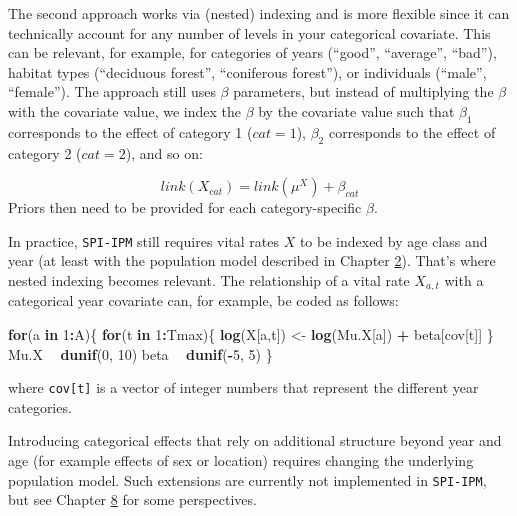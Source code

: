 \documentclass[
]{book}
\newenvironment{Shaded}{\begin{snugshade}}{\end{snugshade}}
\newcommand{\ControlFlowTok}[1]{\textcolor[rgb]{0.13,0.29,0.53}{\textbf{#1}}}
\newcommand{\DecValTok}[1]{\textcolor[rgb]{0.00,0.00,0.81}{#1}}
\newcommand{\KeywordTok}[1]{\textcolor[rgb]{0.13,0.29,0.53}{\textbf{#1}}}
\newcommand{\NormalTok}[1]{#1}
\newcommand{\OperatorTok}[1]{\textcolor[rgb]{0.81,0.36,0.00}{\textbf{#1}}}
\newcommand{\StringTok}[1]{\textcolor[rgb]{0.31,0.60,0.02}{#1}}
\begin{document}
The second approach works via (nested) indexing and is more flexible since it
can technically account for any number of levels in your categorical covariate.
This can be relevant, for example, for categories of years (``good'', ``average'',
``bad''), habitat types (``deciduous forest'', ``coniferous forest''), or individuals
(``male'', ``female'').
The approach still uses \(\beta\) parameters, but instead of multiplying the
\(\beta\) with the covariate value, we index the \(\beta\) by the covariate value
such that \(\beta_1\) corresponds to the effect of category 1 (\(cat = 1\)),
\(\beta_2\) corresponds to the effect of category 2 (\(cat = 2\)), and so on:

\begin{equation}
  link(X_{cat}) = link(\mu^X) + \beta_{cat}
\end{equation}
Priors then need to be provided for each category-specific \(\beta\).

In practice, \texttt{SPI-IPM} still requires vital rates \(X\) to be indexed by age class
and year (at least with the population model described in Chapter \protect\hyperlink{ux5cux2520IPMux5cux2520Construction}{2}).
That's where nested indexing becomes relevant.
The relationship of a vital rate \(X_{a,t}\) with a categorical year covariate can,
for example, be coded as follows:

\begin{Shaded}
\begin{Highlighting}[]
\ControlFlowTok{for}\NormalTok{(a }\ControlFlowTok{in} \DecValTok{1}\OperatorTok{:}\NormalTok{A)\{}
  \ControlFlowTok{for}\NormalTok{(t }\ControlFlowTok{in} \DecValTok{1}\OperatorTok{:}\NormalTok{Tmax)\{}
      \KeywordTok{log}\NormalTok{(X[a,t]) <-}\StringTok{ }\KeywordTok{log}\NormalTok{(Mu.X[a]) }\OperatorTok{+}\StringTok{ }\NormalTok{beta[cov[t]]}
\NormalTok{  \}}
\NormalTok{  Mu.X }\OperatorTok{~}\StringTok{ }\KeywordTok{dunif}\NormalTok{(}\DecValTok{0}\NormalTok{, }\DecValTok{10}\NormalTok{)}
\NormalTok{  beta }\OperatorTok{~}\StringTok{ }\KeywordTok{dunif}\NormalTok{(}\OperatorTok{-}\DecValTok{5}\NormalTok{, }\DecValTok{5}\NormalTok{)}
\NormalTok{\}}
\end{Highlighting}
\end{Shaded}

where \texttt{cov{[}t{]}} is a vector of integer numbers that represent the different year
categories.

Introducing categorical effects that rely on additional structure beyond year
and age (for example effects of sex or location) requires changing the underlying
population model. Such extensions are currently not implemented in \texttt{SPI-IPM},
but see Chapter \protect\hyperlink{ux5cux2520Usefulux5cux2520extensionsux5cux2520andux5cux2520outlook}{8} for some perspectives.
\end{document}
